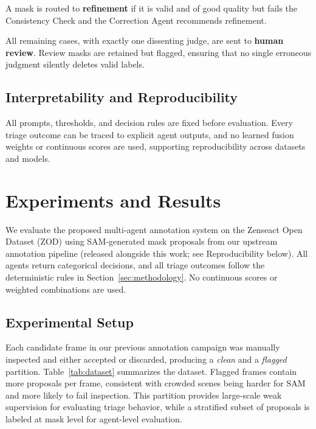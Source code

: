 \documentclass[conference]{IEEEtran}
\begin{document}
A mask is routed to \textbf{refinement} if it is valid and of good quality but fails the Consistency Check and the Correction Agent recommends refinement.

All remaining cases, with exactly one dissenting judge, are sent to \textbf{human review}. 
Review masks are retained but flagged, ensuring that no single erroneous judgment silently deletes valid labels.

\subsection{Interpretability and Reproducibility}

All prompts, thresholds, and decision rules are fixed before evaluation. 
Every triage outcome can be traced to explicit agent outputs, and no learned fusion weights or continuous scores are used, supporting reproducibility across datasets and models.

\section{Experiments and Results}
\label{sec:experiments}

We evaluate the proposed multi-agent annotation system on the Zenseact Open Dataset (ZOD) \cite{alibeigi2023zod} using SAM-generated mask proposals from our upstream annotation pipeline (released alongside this work; see Reproducibility below).
All agents return categorical decisions, and all triage outcomes follow the deterministic rules in Section~\ref{sec:methodology}. 
No continuous scores or weighted combinations are used.

\subsection{Experimental Setup}

Each candidate frame in our previous annotation campaign was manually inspected and either accepted or discarded, producing a \emph{clean} and a \emph{flagged} partition. 
Table~\ref{tab:dataset} summarizes the dataset. 
Flagged frames contain more proposals per frame, consistent with crowded scenes being harder for SAM and more likely to fail inspection. 
This partition provides large-scale weak supervision for evaluating triage behavior, while a stratified subset of proposals is labeled at mask level for agent-level evaluation.



\end{document}
